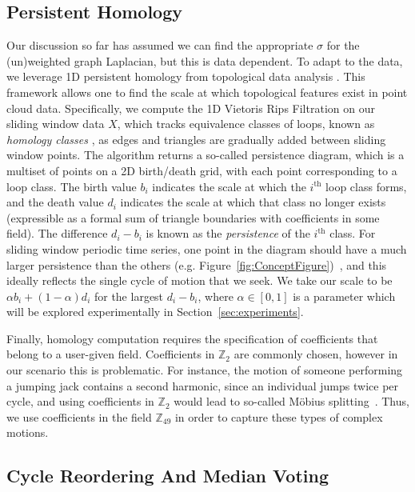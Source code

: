 \documentclass{article}
\begin{document}
\subsection{Persistent Homology}
Our discussion so far has assumed we can find the appropriate $\sigma$ for the (un)weighted graph Laplacian, but this is data dependent.
To adapt to the data, we leverage 1D persistent homology from topological data analysis \cite{edelsbrunner2010computational}.  This framework allows one to find the scale at which topological features exist in point cloud data.  Specifically, we compute the 1D Vietoris Rips Filtration on our sliding window data $X$, which tracks equivalence classes of loops, known as {\em homology classes} \cite{Hatcher}, as edges and triangles are gradually added between sliding window points.  The algorithm returns a so-called persistence diagram, which is a multiset of points on a 2D birth/death grid, with each point corresponding to a loop class.  The birth value $b_i$ indicates the scale at which the $i^{\text{th}}$ loop class forms, and the death value $d_i$ indicates the scale at which that class no longer exists (expressible as a formal sum of triangle boundaries with coefficients in some field).  The difference $d_i - b_i$ is known as the {\em persistence} of the $i^{\text{th}}$ class.  For sliding window periodic time series, one point in the diagram should have a much larger persistence than the others (e.g. Figure~\ref{fig:ConceptFigure})~\cite{perea2015sliding,tralie2017quasi}, and this ideally reflects the single cycle of motion that we seek.  We take our scale to be $\alpha b_i + (1-\alpha)d_i$ for the largest $d_i - b_i$, where $\alpha \in [0, 1]$ is a parameter which will be explored experimentally in Section~\ref{sec:experiments}.

Finally, homology computation requires the specification of coefficients that belong to a user-given field. Coefficients in $\mathbb{Z}_2$ are commonly chosen, however in our scenario this is problematic. For instance, the motion of someone performing a jumping jack contains a second harmonic, since an individual jumps twice per cycle, and using coefficients in $\mathbb{Z}_2$ would lead to so-called M{\"o}bius splitting~\cite{traliemoebius}. Thus, we use coefficients in the field $\mathbb{Z}_{49}$ in order to capture these types of complex motions.

\subsection{Cycle Reordering And Median Voting}
\label{sec:cyclereordering}
\end{document}
